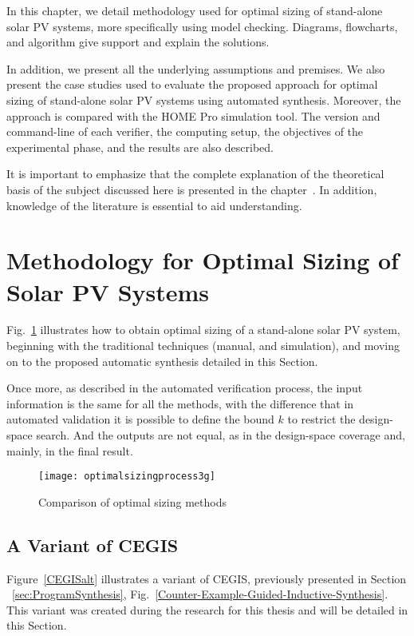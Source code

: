 In this chapter, we detail methodology used for optimal sizing of stand-alone solar PV systems, more specifically using model checking. Diagrams, flowcharts, and algorithm give support and explain the solutions.

In addition, we present all the underlying assumptions and premises. We also present the case studies used to evaluate the proposed approach for optimal sizing of stand-alone solar PV systems using automated synthesis. Moreover, the approach is compared with the HOME Pro simulation tool. The version and command-line of each verifier, the computing setup, the objectives of the experimental phase, and the results are also described.

It is important to emphasize that the complete explanation of the theoretical basis of the subject discussed here is presented in the chapter~. In addition, knowledge of the literature is essential to aid understanding.

\section{Methodology for Optimal Sizing of Solar PV Systems}

Fig.~\ref{fig:optimization} illustrates how to obtain optimal sizing of a stand-alone solar PV system, beginning with the traditional techniques (manual, and simulation), and moving on to the proposed automatic synthesis detailed in this Section. 

Once more, as described in the automated verification process, the input information is the same for all the methods, with the difference that in automated validation it is possible to define the bound $k$ to restrict the design-space search. And the outputs are not equal, as in the design-space coverage and, mainly, in the final result.

\begin{figure}[h]
\texttt{[image: optimalsizingprocess3g]}
\centering
\caption{Comparison of optimal sizing methods}
\label{fig:optimization}
\end{figure}
 
\subsection{A Variant of CEGIS} 

Figure~\ref{CEGISalt} illustrates a variant of CEGIS, previously presented in Section ~\ref{sec:ProgramSynthesis}, Fig.~\ref{Counter-Example-Guided-Inductive-Synthesis}. This variant was created during the research for this thesis and will be detailed in this Section.

